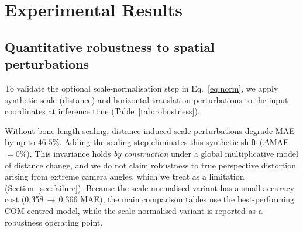 \documentclass[preprint,12pt]{elsarticle}
\begin{document}
\section{Experimental Results}
\label{sec:results}

\subsection{Quantitative robustness to spatial perturbations}
\label{sec:robust_exp}
To validate the optional scale-normalisation step in Eq.~\eqref{eq:norm}, we
apply synthetic scale (distance) and horizontal-translation perturbations to the
input coordinates at inference time (Table~\ref{tab:robustness}).

\begin{table}[htpb]
\centering
\caption{Robustness to affine scale (distance) and translation perturbations.
$\Delta$MAE is the relative change from each model's own unperturbed baseline.}
\label{tab:robustness}
\footnotesize
\setlength{\tabcolsep}{4pt}
\renewcommand{\arraystretch}{0.95}
\end{table}

Without bone-length scaling, distance-induced scale perturbations degrade MAE by
up to $46.5\%$. Adding the scaling step eliminates this synthetic shift
($\Delta$MAE $=0\%$). This invariance holds \emph{by construction} under a global
multiplicative model of distance change, and we do not claim robustness to true
perspective distortion arising from extreme camera angles, which we treat as a
limitation (Section~\ref{sec:failure}). Because the scale-normalised variant has
a small accuracy cost (0.358\,$\to$\,0.366 MAE), the main comparison tables use
the best-performing COM-centred model, while the scale-normalised variant is
reported as a robustness operating point.
\end{document}
